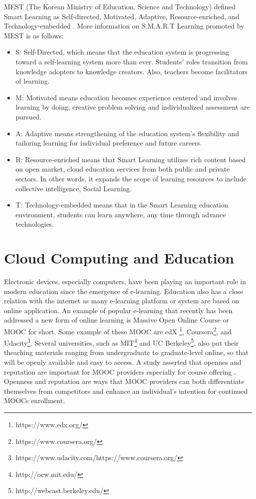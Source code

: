 \documentclass[journal]{vgtc}                %
\begin{document}
MEST (The Korean Ministry of Education, Science and Technology) defined Smart Learning as Self-directed, Motivated, Adaptive, Resource-enriched, and Technology-embedded \cite{mest}. More information on S.M.A.R.T Learning promoted by MEST is as follows:
\begin{itemize}
  \setlength\itemsep{-0.5em}
  \item S: Self-Directed, which means that the education system is progressing toward a self-learning system more than ever. Students’ roles transition from knowledge adopters to knowledge creators. Also, teachers become facilitators of learning.
  \item M: Motivated means education becomes experience centered and involves learning by doing; creative problem solving and individualized assessment are pursued.
  \item A: Adaptive means strengthening of the education system’s flexibility and tailoring learning for individual preference and future careers.
  \item R: Resource-enriched means that Smart Learning utilizes rich content based on open market, cloud education services from both public and private sectors. In other words, it expands the scope of learning resources to include collective intelligence, Social Learning.
  \item T: Technology-embedded means that in the Smart Learning education environment, students can learn anywhere, any time through advance technologies.
\end{itemize}

\section{Cloud Computing and Education}
Electronic devices, especially computers, have been playing an important role in modern education since the emergence of e-learning. Education also has a close relation with the internet as many e-learning platform or system are based on online application. An example of popular e-learning that recently has been addressed a new form of online learning is Massive Open Online Course or MOOC for short\cite{Margaryan2014}. Some example of these MOOC are edX \footnote{https://www.edx.org/}, Coursera\footnote{https://www.coursera.org/}, and Udacity\footnote{https://www.udacity.com/https://www.coursera.org/}. Several universities, such as MIT\footnote{http://ocw.mit.edu/} and UC Berkeley\footnote{http://webcast.berkeley.edu/}, also put their theaching materials ranging from undergraduate to graduate-level online, so that will be openly available and easy to access. A study asserted that opennes and reputation are important for MOOC providers especially for course offering \cite{Alraimi2014}. Openness and reputation are ways that MOOC providers can both differentiate themselves from competitors and enhance an individual's intention for continued MOOCs enrollment.
\end{document}
